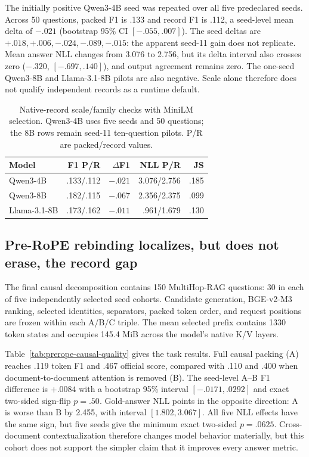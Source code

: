 \documentclass[11pt]{article}
\begin{document}
The initially positive Qwen3-4B seed was repeated over all five predeclared
seeds. Across 50 questions, packed F1 is .133 and record F1 is .112, a seed-level
mean delta of $-.021$ (bootstrap 95\% CI $[-.055,.007]$). The seed deltas are
$+.018,+.006,-.024,-.089,-.015$: the apparent seed-11 gain does not replicate.
Mean answer NLL changes from 3.076 to 2.756, but its delta interval also crosses
zero ($-.320$, $[-.697,.140]$), and output agreement remains zero. The one-seed
Qwen3-8B and Llama-3.1-8B pilots are also negative. Scale alone therefore does
not qualify independent records as a runtime default.

\begin{table}[ht]
\centering
\caption{Native-record scale/family checks with MiniLM selection. Qwen3-4B
uses five seeds and 50 questions; the 8B rows remain seed-11 ten-question
pilots. P/R are packed/record values.}
\label{tab:native-record-scale}
\small
\begin{tabular}{lrrrr}
\toprule
Model & F1 P/R & $\Delta$F1 & NLL P/R & JS \\
\midrule
Qwen3-4B & .133/.112 & $-.021$ & 3.076/2.756 & .185 \\
Qwen3-8B & .182/.115 & $-.067$ & 2.356/2.375 & .099 \\
Llama-3.1-8B & .173/.162 & $-.011$ & .961/1.679 & .130 \\
\bottomrule
\end{tabular}
\end{table}

\subsection{Pre-RoPE rebinding localizes, but does not erase, the record gap}
\label{sec:prerope-causal-results}

The final causal decomposition contains 150 MultiHop-RAG questions: 30 in
each of five independently selected seed cohorts. Candidate generation,
BGE-v2-M3 ranking, selected identities, separators, packed token order, and
request positions are frozen within each A/B/C triple. The mean selected
prefix contains 1330 token states and occupies 145.4 MiB across the model's
native K/V layers.

Table~\ref{tab:prerope-causal-quality} gives the task results. Full causal
packing (A) reaches .119 token F1 and .467 official score, compared with .110
and .400 when document-to-document attention is removed (B). The seed-level
A--B F1 difference is $+.0084$ with a bootstrap 95\% interval
$[-.0171,.0292]$ and exact two-sided sign-flip $p=.50$. Gold-answer NLL points
in the opposite direction: A is worse than B by 2.455, with interval
$[1.802,3.067]$. All five NLL effects have the same sign, but five seeds give
the minimum exact two-sided $p=.0625$. Cross-document contextualization
therefore changes model behavior materially, but this cohort does not support
the simpler claim that it improves every answer metric.
\end{document}
